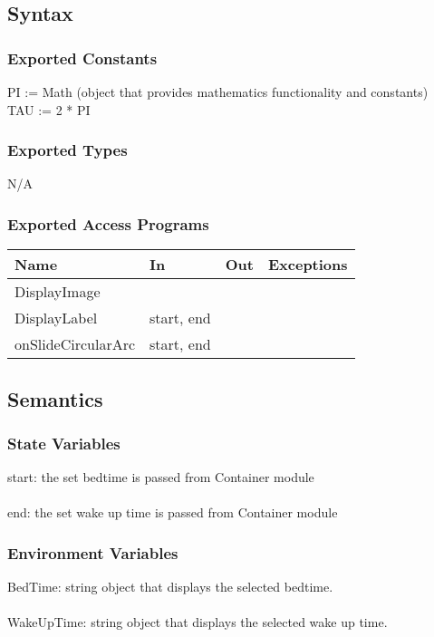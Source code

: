 \documentclass[12pt, titlepage]{article}
\begin{document}
\subsection{Syntax}

\subsubsection{Exported Constants}
PI := Math (object that provides mathematics functionality and constants)\\
TAU := 2 * PI
\subsubsection{Exported Types}
N/A

\subsubsection{Exported Access Programs}

\begin{tabular}{| l | l | l | l |}
	\hline
	{\textbf{Name}} & {\textbf{In}} & {\textbf{Out}} & {\textbf{Exceptions}}\\
	\hline
	{DisplayImage} & & & \\
	\hline
	{DisplayLabel} & start, end & & \\
	\hline
	{onSlideCircularArc} & start, end & & \\
	\hline
\end{tabular}

\subsection{Semantics}

\subsubsection{State Variables}
start: the set bedtime is passed from Container module\\\\
end: the set wake up time is passed from Container module

\subsubsection{Environment Variables}
BedTime: string object that displays the selected bedtime.\\\\
WakeUpTime: string object that displays the selected wake up time.
\end{document}
